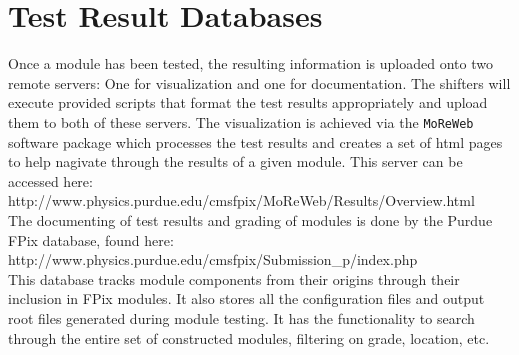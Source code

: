 \section{Test Result Databases}
\label{s:uploading}



Once a module has been tested, the resulting information is uploaded onto two remote servers:
One for visualization and one for documentation.
The shifters will execute provided scripts that format the test results appropriately 
and upload them to both of these servers.
The visualization is achieved via the {\tt MoReWeb} software package which processes the test results
and creates a set of html pages to help nagivate through the results of a given module.
This server can be accessed here: 
\\
http://www.physics.purdue.edu/cmsfpix/MoReWeb/Results/Overview.html
\\
The documenting of test results and grading of modules is done by the Purdue FPix database, found here: 
\\
http://www.physics.purdue.edu/cmsfpix/Submission\_p/index.php
\\
This database tracks module components from their origins through their inclusion in FPix modules.
It also stores all the configuration files and output root files generated during module testing.  
It has the functionality to search through the entire set of constructed modules, filtering on grade, location, etc.



